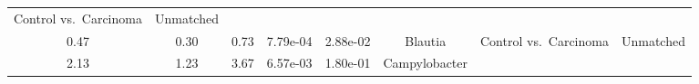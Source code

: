 \documentclass[12pt,]{article}
\begin{document}
\begin{longtable}[]{@{}cccccccc@{}}
\begin{minipage}[t]{0.14\columnwidth}
Control vs.~Carcinoma\strut
\end{minipage} & \begin{minipage}[t]{0.09\columnwidth}\centering\strut
Unmatched\strut
\end{minipage}\tabularnewline
\begin{minipage}[t]{0.05\columnwidth}\centering\strut
0.47\strut
\end{minipage} & \begin{minipage}[t]{0.09\columnwidth}\centering\strut
0.30\strut
\end{minipage} & \begin{minipage}[t]{0.09\columnwidth}\centering\strut
0.73\strut
\end{minipage} & \begin{minipage}[t]{0.07\columnwidth}\centering\strut
7.79e-04\strut
\end{minipage} & \begin{minipage}[t]{0.07\columnwidth}\centering\strut
2.88e-02\strut
\end{minipage} & \begin{minipage}[t]{0.20\columnwidth}\centering\strut
Blautia\strut
\end{minipage} & \begin{minipage}[t]{0.14\columnwidth}\centering\strut
Control vs.~Carcinoma\strut
\end{minipage} & \begin{minipage}[t]{0.09\columnwidth}\centering\strut
Unmatched\strut
\end{minipage}\tabularnewline
\begin{minipage}[t]{0.05\columnwidth}\centering\strut
2.13\strut
\end{minipage} & \begin{minipage}[t]{0.09\columnwidth}\centering\strut
1.23\strut
\end{minipage} & \begin{minipage}[t]{0.09\columnwidth}\centering\strut
3.67\strut
\end{minipage} & \begin{minipage}[t]{0.07\columnwidth}\centering\strut
6.57e-03\strut
\end{minipage} & \begin{minipage}[t]{0.07\columnwidth}\centering\strut
1.80e-01\strut
\end{minipage} & \begin{minipage}[t]{0.20\columnwidth}\centering\strut
Campylobacter\strut
\end{minipage} & \begin{minipage}[t]{0.14\columnwidth}\centering\strut

\end{minipage}
\end{longtable}
\end{document}
